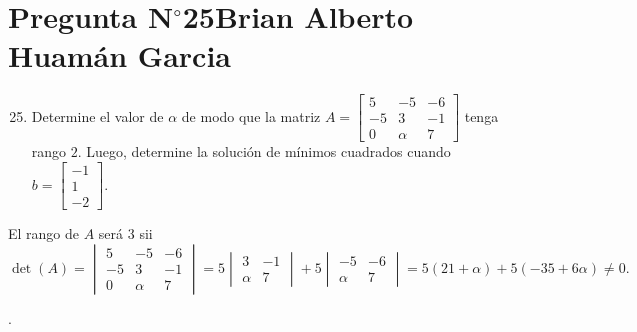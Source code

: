 \section{Pregunta N$^{\circ}$25\qquad Brian Alberto Huamán Garcia}

\begin{frame}
	\begin{enumerate}\setcounter{enumi}{24}
		\item

		      Determine el valor de $\alpha$ de modo que la matriz
		      \begin{math}
			      A=
			      \begin{bmatrix}
				      5  & -5     & -6 \\
				      -5 & 3      & -1 \\
				      0  & \alpha & 7
			      \end{bmatrix}
		      \end{math}
		      tenga rango $2$.
		      Luego, determine la solución de mínimos cuadrados cuando
		      \begin{math}
			      b=
			      \begin{bmatrix}
				      -1 \\
				      1  \\
				      -2
			      \end{bmatrix}
		      \end{math}.
	\end{enumerate}

	\begin{solution}
		El rango de $A$ será $3$ sii
		\begin{equation*}
			\det\left(A\right)=
			\begin{vmatrix}
				5  & -5     & -6 \\
				-5 & 3      & -1 \\
				0  & \alpha & 7
			\end{vmatrix}=
			5\begin{vmatrix}
				3      & -1 \\
				\alpha & 7
			\end{vmatrix}+
			5\begin{vmatrix}
				-5     & -6 \\
				\alpha & 7
			\end{vmatrix}=
			5\left(21+\alpha\right)+
			5\left(-35+6\alpha\right)\neq0.
		\end{equation*}

	\end{solution}
\end{frame}

\begin{frame}
	\begin{solution}

		.
	\end{solution}
\end{frame}